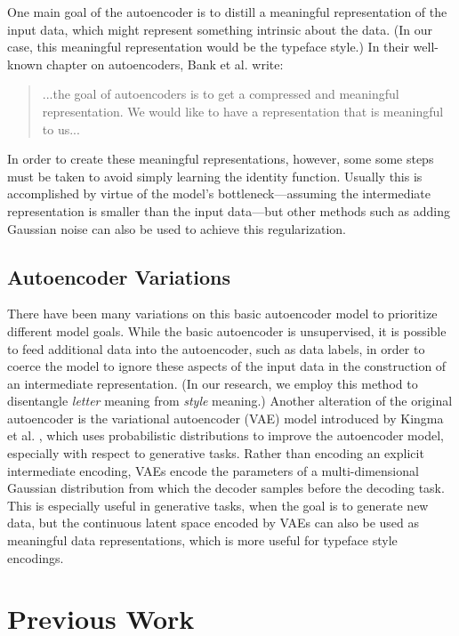 \noindent One main goal of the autoencoder is to distill a meaningful representation of the input data, which might represent something intrinsic about the data. (In our case, this meaningful representation would be the typeface style.) In their well-known chapter on autoencoders, Bank et al. write:

\begin{quote}
    ...the goal of autoencoders is to get a compressed and meaningful
    representation. We would like to have a representation that is meaningful to us... \cite{bank2021autoencoders}
\end{quote}

\noindent In order to create these meaningful representations, however, some some steps must be taken to avoid simply learning the identity function. Usually this is accomplished by virtue of the model's bottleneck—assuming the intermediate representation is smaller than the input data—but other methods such as adding Gaussian noise can also be used to achieve this regularization.

\subsection{Autoencoder Variations}

There have been many variations on this basic autoencoder model to prioritize different model goals. While the basic autoencoder is unsupervised, it is possible to feed additional data into the autoencoder, such as data labels, in order to coerce the model to ignore these aspects of the input data in the construction of an intermediate representation. (In our research, we employ this method to disentangle \textit{letter} meaning from \textit{style} meaning.) Another alteration of the original autoencoder is the variational autoencoder (VAE) model introduced by Kingma et al. \cite{kingma2013}, which uses probabilistic distributions to improve the autoencoder model, especially with respect to generative tasks. Rather than encoding an explicit intermediate encoding, VAEs encode the parameters of a multi-dimensional Gaussian distribution from which the decoder samples before the decoding task. This is especially useful in generative tasks, when the goal is to generate new data, but the continuous latent space encoded by VAEs can also be used as meaningful data representations, which is more useful for typeface style encodings.

\section{Previous Work}

